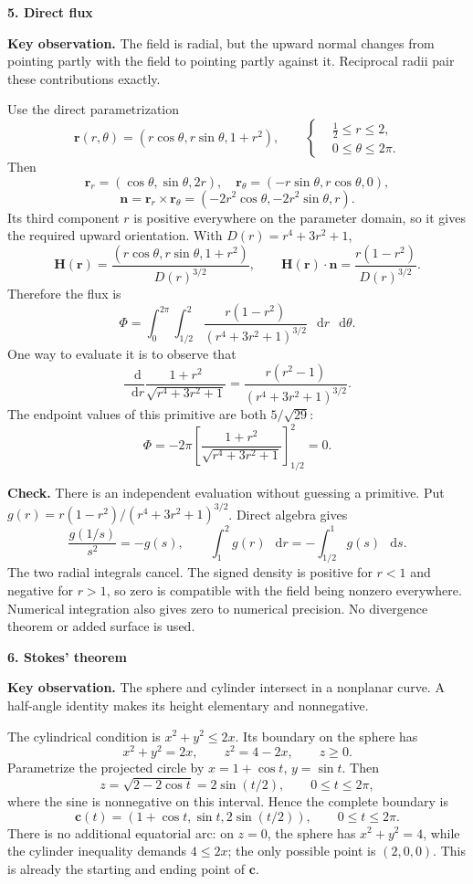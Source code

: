 \documentclass[11pt,letterpaper]{article}
\renewcommand{\vec}[1]{\mathbf{#1}}
\newcommand{\dd}{\mathop{}\!\mathrm{d}}
\newcommand{\solutionproblem}[3]{%
  \par\bigskip\Needspace{7\baselineskip}
  \noindent\textbf{#1. #2}\par\nobreak
}
\newcommand{\insight}[1]{\par\textbf{Key observation.} #1\par}
\newcommand{\verification}[1]{\par\textbf{Check.} #1\par}
\begin{document}
\solutionproblem{5}{Direct flux}{20}
\insight{The field is radial, but the upward normal changes from pointing
partly with the field to pointing partly against it. Reciprocal radii
pair these contributions exactly.}
Use the direct parametrization
\[
\vec r(r,\theta)=(r\cos\theta,r\sin\theta,1+r^2),\qquad
\left\{\begin{aligned}
&\tfrac12\le r\le2,\\
&0\le\theta\le2\pi.
\end{aligned}\right.
\]
Then
\[
\vec r_r=(\cos\theta,\sin\theta,2r),\quad
\vec r_\theta=(-r\sin\theta,r\cos\theta,0),
\]
\[
\vec n=\vec r_r\times\vec r_\theta
=(-2r^2\cos\theta,-2r^2\sin\theta,r).
\]
Its third component $r$ is positive everywhere on the parameter domain,
so it gives the required upward orientation. With $D(r)=r^4+3r^2+1$,
\[
\vec H(\vec r)=
\frac{(r\cos\theta,r\sin\theta,1+r^2)}{D(r)^{3/2}},\qquad
\vec H(\vec r)\cdot\vec n
=\frac{r(1-r^2)}{D(r)^{3/2}}.
\]
Therefore the flux is
\[
\Phi=\int_0^{2\pi}\int_{1/2}^2
\frac{r(1-r^2)}{(r^4+3r^2+1)^{3/2}}\,\dd r\,\dd\theta.
\]
One way to evaluate it is to observe that
\[
\frac{\dd}{\dd r}\frac{1+r^2}{\sqrt{r^4+3r^2+1}}
=\frac{r(r^2-1)}{(r^4+3r^2+1)^{3/2}}.
\]
The endpoint values of this primitive are both $5/\sqrt{29}$:
\[
\boxed{\Phi=-2\pi\left[
\frac{1+r^2}{\sqrt{r^4+3r^2+1}}\right]_{1/2}^2=0.}
\]
\verification{There is an independent evaluation without guessing a
primitive. Put $g(r)=r(1-r^2)/(r^4+3r^2+1)^{3/2}$. Direct algebra gives
\[
\frac{g(1/s)}{s^2}=-g(s),\qquad
\int_1^2g(r)\,\dd r=-\int_{1/2}^1g(s)\,\dd s.
\]
The two radial integrals cancel. The signed density is positive for
$r<1$ and negative for $r>1$, so zero is compatible with the field being
nonzero everywhere. Numerical integration also gives zero to numerical
precision. No divergence theorem or added surface is used.}

\solutionproblem{6}{Stokes' theorem}{20}
\insight{The sphere and cylinder intersect in a nonplanar curve. A
half-angle identity makes its height elementary and nonnegative.}
The cylindrical condition is $x^2+y^2\le2x$. Its boundary on the sphere
has
\[
x^2+y^2=2x,\qquad z^2=4-2x,\qquad z\ge0.
\]
Parametrize the projected circle by $x=1+\cos t$, $y=\sin t$.
Then
\[
z=\sqrt{2-2\cos t}=2\sin(t/2),\qquad0\le t\le2\pi,
\]
where the sine is nonnegative on this interval. Hence the complete
boundary is
\[
\vec c(t)=(1+\cos t,\sin t,2\sin(t/2)),\qquad0\le t\le2\pi.
\]
There is no additional equatorial arc: on $z=0$, the sphere has
$x^2+y^2=4$, while the cylinder inequality demands $4\le2x$;
the only possible point is $(2,0,0)$. This is already the starting and
ending point of $\vec c$.
\end{document}

